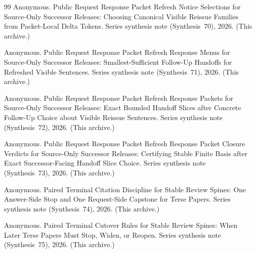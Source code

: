 \documentclass[11pt]{article}
\begin{document}
\begin{thebibliography}{99}
Anonymous.
\newblock Public Request Response Packet Refresh Notice Selections for Source-Only Successor Releases: Choosing Canonical Visible Reissue Families from Packet-Local Delta Tokens.
\newblock Series synthesis note (Synthesis~70), 2026. (This archive.)

Anonymous.
\newblock Public Request Response Packet Refresh Response Menus for Source-Only Successor Releases: Smallest-Sufficient Follow-Up Handoffs for Refreshed Visible Sentences.
\newblock Series synthesis note (Synthesis~71), 2026. (This archive.)


Anonymous.
\newblock Public Request Response Packet Refresh Response Packets for Source-Only Successor Releases: Exact Bounded Handoff Slices after Concrete Follow-Up Choice about Visible Reissue Sentences.
\newblock Series synthesis note (Synthesis~72), 2026. (This archive.)

Anonymous.
\newblock Public Request Response Packet Refresh Response Packet Closure Verdicts for Source-Only Successor Releases: Certifying Stable Finite Basis after Exact Successor-Facing Handoff Slice Choice.
\newblock Series synthesis note (Synthesis~73), 2026. (This archive.)

Anonymous.
\newblock Paired Terminal Citation Discipline for Stable Review Spines: One Answer-Side Stop and One Request-Side Capstone for Terse Papers.
\newblock Series synthesis note (Synthesis~74), 2026. (This archive.)

Anonymous.
\newblock Paired Terminal Cutover Rules for Stable Review Spines: When Later Terse Papers Must Stop, Widen, or Reopen.
\newblock Series synthesis note (Synthesis~75), 2026. (This archive.)

\end{thebibliography}
\end{document}
